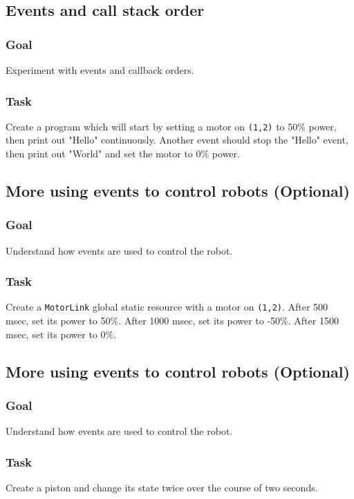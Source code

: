 \documentclass[a4paper]{article}
\begin{document}
\pagebreak\subsection{Events and call stack order}
\subsubsection{Goal} Experiment with events and callback orders.
\setcounter{subsubsection}{2}\subsubsection{Task} Create a program which will start by setting a motor on \lstinline{(1,2)}{} to 50\% power, then print out "Hello" continuously. Another event should stop the "Hello" event, then print out "World" and set the motor to 0\% power.

\subsection{More using events to control robots (Optional)}
\subsubsection{Goal} Understand how events are used to control the robot.
\setcounter{subsubsection}{2}\subsubsection{Task} Create a \lstinline{MotorLink} global static resource with a motor on \lstinline{(1,2)}. After 500 msec, set its power to 50\%. After 1000 msec, set its power to -50\%. After 1500 msec, set its power to 0\%. 

\subsection{More using events to control robots (Optional)}
\subsubsection{Goal} Understand how events are used to control the robot.
\setcounter{subsubsection}{2}\subsubsection{Task} Create a piston and change its state twice over the course of two seconds.
\end{document}

